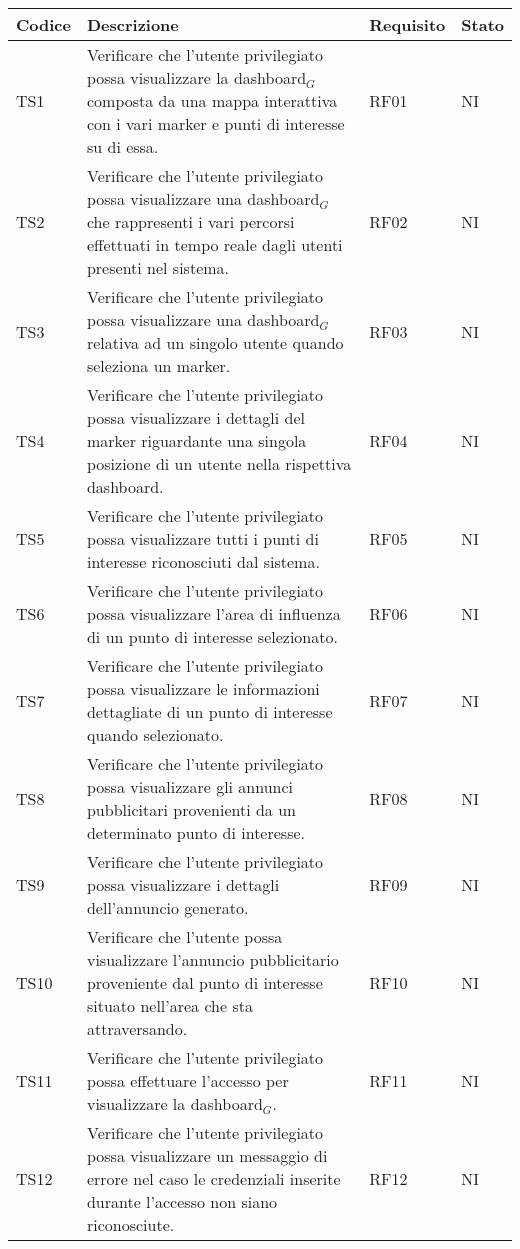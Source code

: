\documentclass[10pt]{article}
\begin{document}
\begin{justify}
\begin{longtable}{|>{\centering\arraybackslash}m{2cm}|>{\centering\arraybackslash}m{7cm}|>{\centering\arraybackslash}m{2cm}|>{\centering\arraybackslash}m{2cm}|}
\hline
\textbf{Codice} & \textbf{Descrizione} & \textbf{Requisito} & \textbf{Stato}\\
\endhead
\hline
TS1 & Verificare che l'utente privilegiato possa visualizzare la dashboard$_G$ composta da una mappa interattiva con i vari marker e punti di interesse su di essa. & RF01 & NI\\
\hline
TS2 & Verificare che l'utente privilegiato possa visualizzare una dashboard$_G$ che rappresenti i vari percorsi effettuati in tempo reale dagli utenti presenti nel sistema. & RF02 & NI\\
\hline
TS3 & Verificare che l'utente privilegiato possa visualizzare una dashboard$_G$ relativa ad un singolo utente quando seleziona un marker. & RF03 & NI\\
\hline
TS4 & Verificare che l'utente privilegiato possa visualizzare i dettagli del marker riguardante una singola posizione di un utente nella rispettiva dashboard. & RF04 & NI\\
\hline
TS5 & Verificare che l'utente privilegiato possa visualizzare tutti i punti di interesse riconosciuti dal sistema. & RF05 & NI\\
\hline
TS6 & Verificare che l'utente privilegiato possa visualizzare l'area di influenza di un punto di interesse selezionato. & RF06 & NI\\
\hline
TS7 & Verificare che l'utente privilegiato possa visualizzare le informazioni dettagliate di un punto di interesse quando selezionato. & RF07 & NI\\
\hline
TS8 & Verificare che l'utente privilegiato possa visualizzare gli annunci pubblicitari provenienti da un determinato punto di interesse. & RF08 & NI\\
\hline
TS9 & Verificare che l'utente privilegiato possa visualizzare i dettagli dell'annuncio generato. & RF09 & NI\\
\hline
TS10 & Verificare che l'utente possa visualizzare l'annuncio pubblicitario proveniente dal punto di interesse situato nell'area che sta attraversando. & RF10 & NI\\
\hline
TS11 & Verificare che l'utente privilegiato possa effettuare l'accesso per visualizzare la dashboard$_G$. & RF11 & NI\\
\hline
TS12 & Verificare che l'utente privilegiato possa visualizzare un messaggio di errore nel caso le credenziali inserite durante l'accesso non siano riconosciute. & RF12 & NI\\

\end{longtable}
\end{justify}
\end{document}
